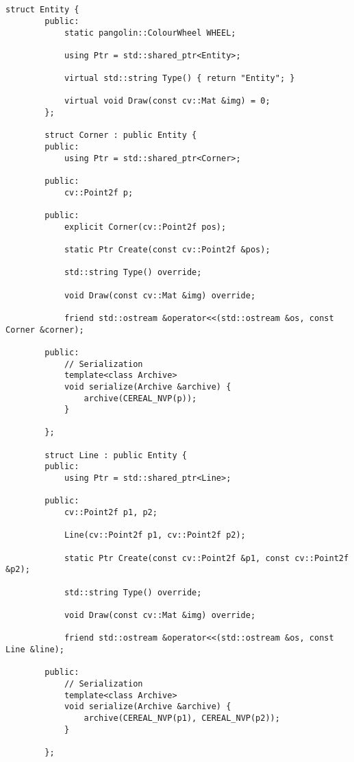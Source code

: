 \documentclass[12pt, onecolumn]{article}
\newcommand\normf{\fangsong}
\begin{document}
	\section{\normf{附录：代码}}
	\begin{lstlisting}[caption={\normf 点和直线的数据结构}]
	    struct Entity {
	    public:
	        static pangolin::ColourWheel WHEEL;
	
	        using Ptr = std::shared_ptr<Entity>;
	
	        virtual std::string Type() { return "Entity"; }
	
	        virtual void Draw(const cv::Mat &img) = 0;
	    };
	
	    struct Corner : public Entity {
	    public:
	        using Ptr = std::shared_ptr<Corner>;
	
	    public:
	        cv::Point2f p;
	
	    public:
	        explicit Corner(cv::Point2f pos);
	
	        static Ptr Create(const cv::Point2f &pos);
	
	        std::string Type() override;
	
	        void Draw(const cv::Mat &img) override;
	
	        friend std::ostream &operator<<(std::ostream &os, const Corner &corner);
	
	    public:
	        // Serialization
	        template<class Archive>
	        void serialize(Archive &archive) {
	            archive(CEREAL_NVP(p));
	        }
	
	    };
	
	    struct Line : public Entity {
	    public:
	        using Ptr = std::shared_ptr<Line>;
	
	    public:
	        cv::Point2f p1, p2;
	
	        Line(cv::Point2f p1, cv::Point2f p2);
	
	        static Ptr Create(const cv::Point2f &p1, const cv::Point2f &p2);
	
	        std::string Type() override;
	
	        void Draw(const cv::Mat &img) override;
	
	        friend std::ostream &operator<<(std::ostream &os, const Line &line);
	
	    public:
	        // Serialization
	        template<class Archive>
	        void serialize(Archive &archive) {
	            archive(CEREAL_NVP(p1), CEREAL_NVP(p2));
	        }
	
	    };
	\end{lstlisting}
\end{document}

